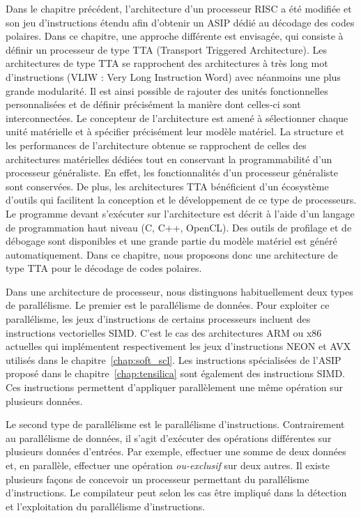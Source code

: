 Dans le chapitre précédent, l'architecture d'un processeur RISC a été modifiée et son jeu d'instructions étendu afin d'obtenir un ASIP dédié au décodage des codes polaires. Dans ce chapitre, une approche différente est envisagée, qui consiste à définir un processeur de type TTA (Transport Triggered Architecture).
Les architectures de type TTA se rapprochent des architectures à très long mot d'instructions (VLIW : Very Long Instruction Word) avec néanmoins une plus grande modularité. Il est ainsi possible de rajouter des unités fonctionnelles personnalisées et de définir précisément la manière dont celles-ci sont interconnectées. Le concepteur de l'architecture est amené à sélectionner chaque unité matérielle et à spécifier précisément leur modèle matériel. La structure et les performances de l'architecture obtenue se rapprochent de celles des architectures matérielles dédiées tout en conservant la programmabilité d'un processeur généraliste. En effet, les fonctionnalités d'un processeur généraliste sont conservées. De plus, les architectures TTA bénéficient d'un écosystème d'outils qui facilitent la conception et le développement de ce type de processeurs. Le programme devant s'exécuter sur l'architecture est décrit à l'aide d'un langage de programmation haut niveau  (C, C++, OpenCL). Des outils de profilage et de débogage sont disponibles et une grande partie du modèle matériel est généré automatiquement. Dans ce chapitre, nous proposons donc une architecture de type TTA pour le décodage de codes polaires.

Dans une architecture de processeur, nous distinguons habituellement deux types de parallélisme.
Le premier est le parallélisme de données.
Pour exploiter ce parallélisme, les jeux d'instructions de certains processeurs incluent des instructions vectorielles SIMD.
C'est le cas des architectures ARM ou x86 actuelles qui implémentent respectivement les jeux d'instructions NEON et AVX utilisés dans le chapitre~\ref{chap:soft_scl}.
Les instructions spécialisées de l'ASIP proposé dans le chapitre~\ref{chap:tensilica} sont également des instructions SIMD.
Ces instructions permettent d'appliquer parallèlement une même opération sur plusieurs données.

Le second type de parallélisme est le parallélisme d'instructions. Contrairement au parallélisme de données, il s'agit d'exécuter des opérations différentes sur plusieurs données d'entrées. Par exemple, effectuer une somme de deux données et, en parallèle, effectuer une opération \textit{ou-exclusif} sur deux autres.
Il existe plusieurs façons de concevoir un processeur permettant du parallélisme d'instructions. Le compilateur peut selon les cas être impliqué dans la détection et l'exploitation du parallélisme d'instructions.

